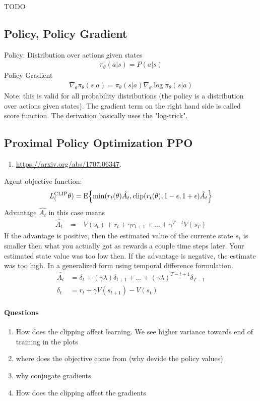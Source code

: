 TODO


\subsection{Policy, Policy Gradient}

Policy: Distribution over actions given states
\renewcommand{\policy}[2]{\pi_\theta (#1 | #2)}
\begin{align}
	\policy{a}{s} = P(a | s)
\end{align}
Policy Gradient
\begin{align}
	\nabla_\theta \policy{s}{a} = \policy{s}{a} \nabla_\theta \log \policy{s}{a}
\end{align}
Note: this is valid for all probability distributions (the policy is a distribution over actions given states). The gradient term on the right hand side is called score function. The derivation basically uses the "log-trick".


\subsection{Proximal Policy Optimization PPO}
\newcommand{\oldpolicy}[2]{\pi_{\theta_{\mathrm{old}}} ( {#1} | {#2})}
\begin{enumerate}
	\item \url{https://arxiv.org/abs/1707.06347}. 
\end{enumerate}
Agent objective function:
\begin{align}
	L^{\mathrm{CLIP}}_( \theta) 
	= \mathrm{E}\!\left\{{
		\min(r_t(\theta) \hat{A_t}, \mathrm{clip}(r_t(\theta), 1-\epsilon, 1+\epsilon) \hat{A_t}
	}\right\}
\end{align}
Advantage $\hat{A_t}$ in this case means
\begin{align}
	\hat{A_t} &= -V(s_t) + r_t + \gamma r_{t+1} + \dots + \gamma^{T-t}V(s_T)
\end{align}
If the advantage is positive, then the estimated value of the currente state $s_t$ is smaller then what you actually got
as rewards a couple time steps later. Your estimated state value was too low then.
If the advantage is negative, the estimate was too high.
In a generalized form using temporal difference formulation.
\begin{align}
	\hat{A_t} &= \delta_t + (\gamma \lambda)\delta_{t+1} + \dots + (\gamma\lambda)^{T-t+1}\delta_{T-1} \\
	\delta_t &= r_t + \gamma V(s_{t+1}) - V(s_t)
\end{align}



\paragraph{Questions}
\begin{enumerate}
	\item How does the clipping affect learning. We see higher variance towards end of training in the plots
	\item where does the objective come from (why devide the policy values)
	\item why conjugate gradients
	\item How does the clipping affect the gradients
\end{enumerate}
